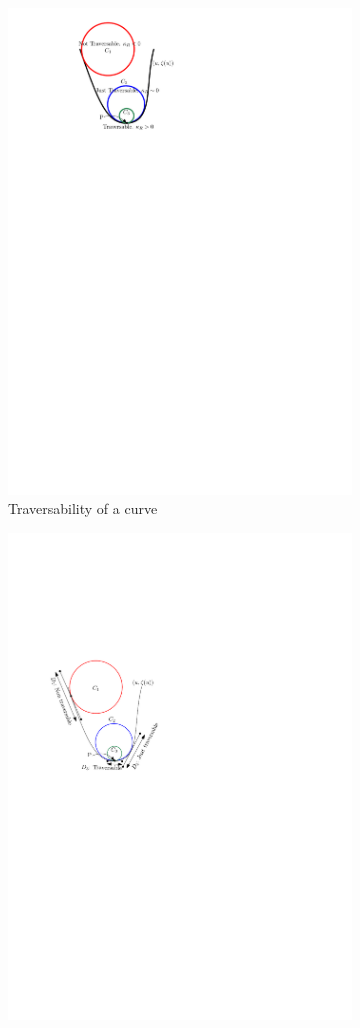 \documentclass[12pt,a4]{article}
\begin{document}
\begin{figure}[ht!]
\begin{subfigure}{0.31\textwidth}
		\centering
		\includegraphics[width=0.75\linewidth]{figures/Traversability.pdf}
		\caption{Traversability of a curve \label{fig:is_traversable}}
	\end{subfigure}%
	\begin{subfigure}{0.31\textwidth}
		\centering
		\includegraphics[width=0.85\linewidth]{figures/Traversability2.pdf}

\end{subfigure}
\end{figure}
\end{document}
